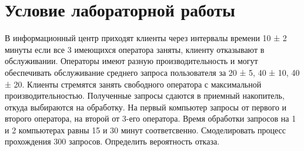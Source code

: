 \section{Условие лабораторной работы}
В информационный центр приходят клиенты через интервалы времени 10 ± 2 минуты если все 3 имеющихся оператора заняты, клиенту отказывают в обслуживании. 
Операторы имеют разную производительность и могут обеспечивать обслуживание среднего запроса пользователя за 20 ± 5, 40 ± 10, 40 ± 20. 
Клиенты стремятся занять свободного оператора с максимальной производительностью. 
Полученные запросы сдаются в приемный накопитель, откуда выбираются на обработку. 
На первый компьютер запросы от первого и второго оператора, на второй от 3-его оператора. 
Время обработки запросов на 1 и 2 компьютерах равны 15 и 30 минут соответсвенно. 
Смоделировать процесс прохождения 300 запросов. Определить вероятность отказа.